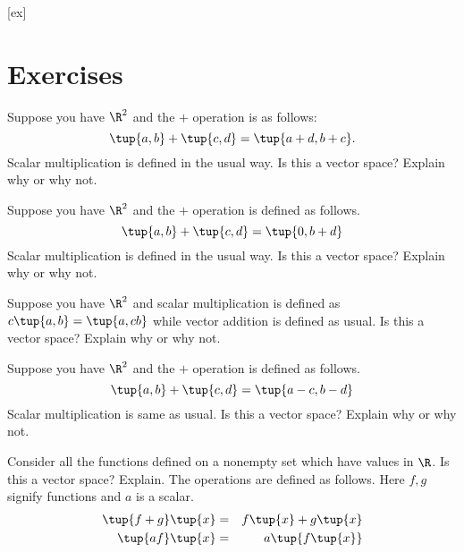 [ex]
\section*{Exercises}

\begin{enumialphparenastyle}

\begin{ex} Suppose you have $\R^{2}$ and the $+$ operation is as
follows:\ 
\begin{equation*}
\tup{a,b} +\tup{c,d} =\tup{a+d,b+c} .
\end{equation*}
Scalar multiplication is defined in the usual way. Is this a vector space?
Explain why or why not. 
\end{ex}

\begin{ex} Suppose you have $\R^{2}$ and the $+$ operation is defined as
follows. 
\begin{equation*}
\tup{a,b} +\tup{c,d} =\tup{0,b+d}
\end{equation*}
Scalar multiplication is defined in the usual way. Is this a vector space?
Explain why or why not. 
\end{ex}

\begin{ex} Suppose you have $\R^{2}$ and scalar multiplication is defined
as $c\tup{a,b} =\tup{a,cb} $ while vector addition is
defined as usual. Is this a vector space? Explain why or why not.
\end{ex}

\begin{ex} Suppose you have $\R^{2}$ and the $+$ operation is defined as
follows. 
\begin{equation*}
\tup{a,b} +\tup{c,d} =\tup{a-c,b-d}
\end{equation*}
Scalar multiplication is same as usual. Is this a vector space? Explain why
or why not. 
\end{ex}

\begin{ex} \label{functions}Consider all the functions defined on a nonempty set
which have values in $\R$. Is this a vector space? Explain.
The operations are defined as follows. Here $f,g$ signify functions and $a$
is a scalar. 
\begin{eqnarray*}
\tup{f+g} \tup{x} &=&f\tup{x} +g\tup{x} \\
\tup{af} \tup{x} &=&a\tup{f\tup{x} }
\end{eqnarray*}
\end{ex}



\end{enumialphparenastyle}
